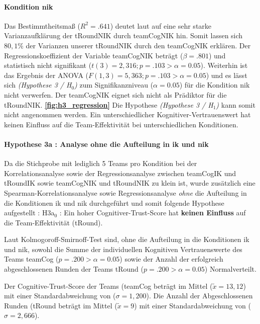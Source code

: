 \documentclass[a4paper,11pt]{article}%
\renewcommand{\\}{\vspace*{0.5\baselineskip} \newline}
\begin{document}
\paragraph{Kondition \ac{nik}}
Das Bestimmtheitsmaß ($R^{2} = .641$) deutet laut \citep{cohen2013statistical} auf eine sehr starke Varianzaufklärung der \ac{tRoundNIK} durch \ac{teamCogNIK} hin. Somit lassen sich $80,1\%$ der Varianzen unserer \ac{tRoundNIK} durch den \ac{teamCogNIK} erklären. \\
Der Regressionskoeffizient der Variable \ac{teamCogNIK} beträgt ($\beta = .801$) und statistisch nicht signifikant ($t(3) = 2,316; p = .103 > \alpha = 0.05$). \\
Weiterhin ist das Ergebnis der ANOVA ($F(1,3) = 5,363; p = .103 > \alpha = 0.05$) und es lässt sich \textit{(Hypothese 3 / H$_{0}$)} zum Signifikanzniveau ($\alpha = 0.05$) für die Kondition \ac{nik} nicht verwerfen. \\
Der \ac{teamCogNIK} eignet sich nicht als Prädiktor für die \ac{tRoundNIK}.
\textbf{\autoref{fig:h3_regression}}\\
Die Hypothese \textit{(Hypothese 3 / H$_{1}$)} kann somit nicht angenommen werden. Ein unterschiedlicher Kognitiver-Vertrauenswert hat keinen Einfluss auf die Team-Effektivität bei unterschiedlichen Konditionen.

\paragraph{Hypothese 3a : Analyse ohne die Aufteilung in \ac{ik} und \ac{nik} }
Da die Stichprobe mit lediglich 5 Teams pro Kondition bei der Korrelationsanalyse sowie der Regressionsanalyse zwischen \ac{teamCogIK} und \ac{tRoundIK} sowie \ac{teamCogNIK} und \ac{tRoundNIK} zu klein ist, wurde zusätzlich eine Spearman-Korrelationsanalyse sowie Regressionsanalyse \textit{ohne} die Aufteilung in die Konditionen \ac{ik} und \ac{nik} durchgeführt und somit folgende Hypothese aufgestellt :\\
H3a$_{0}$ : Ein hoher Cognitiver-Trust-Score hat \textbf{keinen Einfluss} auf die Team-Effektivität (\ac{tRound}).

Laut Kolmogoroff-Smirnoff-Test sind, ohne die Aufteilung in die Konditionen \ac{ik} und \ac{nik}, sowohl die Summe der individuellen Kognitiven Vertrauenswerte des Teams \ac{teamCog} ($p = .200 > \alpha = 0.05$) sowie der Anzahl der erfolgreich abgeschlossenen Runden der Teams \ac{tRound} ($p = .200 > \alpha = 0.05$) Normalverteilt.

Der Cognitive-Trust-Score der Teams (\ac{teamCog} beträgt im Mittel ($\tilde x = 13,12$) mit einer Standardabweichung von ($\sigma = 1,200$).
Die Anzahl der Abgeschlossenen Runden (\ac{tRound} beträgt im Mittel ($\tilde x = 9$) mit einer Standardabweichung von ($\sigma = 2,666$). 
\end{document}
